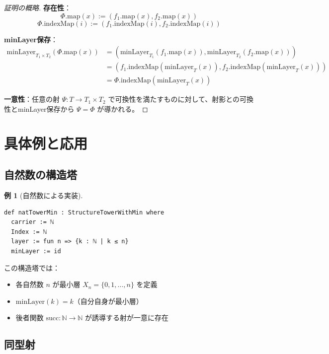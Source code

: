 \documentclass[a4paper,12pt]{ltjsarticle}
\theoremstyle{definition}
\newtheorem{example}[theorem]{例}
\newcommand{\N}{\mathbb{N}}
\begin{document}
\begin{proof}[証明の概略]
\textbf{存在性}：
\[
\Phi.\mathrm{map}(x) := (f_1.\mathrm{map}(x), f_2.\mathrm{map}(x))
\]
\[
\Phi.\mathrm{indexMap}(i) := (f_1.\mathrm{indexMap}(i), f_2.\mathrm{indexMap}(i))
\]

\textbf{minLayer保存}：
\begin{align*}
\mathrm{minLayer}_{T_1 \times T_2}(\Phi.\mathrm{map}(x))
&= (\mathrm{minLayer}_{T_1}(f_1.\mathrm{map}(x)), \mathrm{minLayer}_{T_2}(f_2.\mathrm{map}(x))) \\
&= (f_1.\mathrm{indexMap}(\mathrm{minLayer}_T(x)), f_2.\mathrm{indexMap}(\mathrm{minLayer}_T(x))) \\
&= \Phi.\mathrm{indexMap}(\mathrm{minLayer}_T(x))
\end{align*}

\textbf{一意性}：任意の射 $\Psi : T \to T_1 \times T_2$ で可換性を満たすものに対して、射影との可換性とminLayer保存から $\Psi = \Phi$ が導かれる。
\end{proof}

\section{具体例と応用}

\subsection{自然数の構造塔}

\begin{example}[自然数による実装]
\begin{verbatim}
def natTowerMin : StructureTowerWithMin where
  carrier := ℕ
  Index := ℕ
  layer := fun n => {k : ℕ | k ≤ n}
  minLayer := id
\end{verbatim}

この構造塔では：
\begin{itemize}
\item 各自然数 $n$ が最小層 $X_n = \{0, 1, \ldots, n\}$ を定義
\item $\mathrm{minLayer}(k) = k$（自分自身が最小層）
\item 後者関数 $\mathrm{succ} : \N \to \N$ が誘導する射が一意に存在
\end{itemize}
\end{example}

\subsection{同型射}
\end{document}
